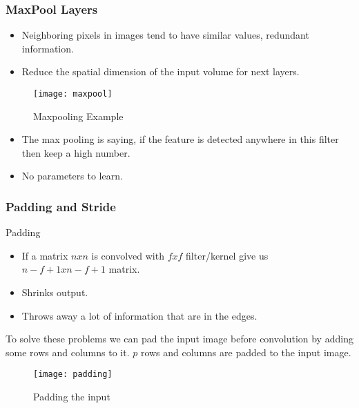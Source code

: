 \documentclass[aspectratio=169, 10pt]{beamer}
\begin{document}
\begin{frame}
	\frametitle{MaxPool Layers}
	\begin{itemize}
		\item Neighboring pixels in images tend to have similar values, redundant information.
		\item Reduce the spatial dimension of the input volume for next layers.
	\end{itemize}
	
	\begin{figure}
	\texttt{[image: maxpool]}
	\caption{Maxpooling Example}
	\end{figure}
	\begin{itemize}
		\item The max pooling is saying, if the feature is detected anywhere in this filter then keep a high number.
		\item No parameters to learn.
	\end{itemize}
	
\end{frame}


\begin{frame}
	\frametitle{Padding and Stride}
	
	\begin{block}{Padding}
		\begin{itemize}
			\item If a matrix $nxn$ is convolved with $fxf$ filter/kernel give us $ n-f+1 x n-f+1$ matrix.
			\item Shrinks output.
			\item Throws away a lot of information that are in the edges.
		\end{itemize}
		To solve these problems we can pad the input image before convolution by adding some rows and columns to it. $p$ rows and columns are padded to the input image. 
		\begin{figure}
		\texttt{[image: padding]}
		\caption{Padding the input}
		\end{figure}
		
	\end{block}
	
	
	

\end{frame}
\end{document}
